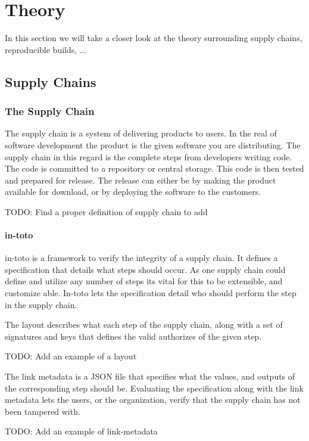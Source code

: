 \documentclass[../Main/thesis.tex]{subfiles}
\begin{document}
\chapter{Theory}
\label{ch:theory}
In this section we will take a closer look at the theory surrounding
supply chains, reproducible builds, ...

\section{Supply Chains}\label{sec:supply_chain}
    \subsection*{The Supply Chain}
    The supply chain is a system of delivering products to users. In the real of
    software development the product is the given software you are distributing.
    The supply chain in this regard is the complete steps from developers
    writing code. The code is committed to a repository or central storage. This
    code is then tested and prepared for release. The release can either be by
    making the product available for download, or by deploying the software to
    the customers.

    TODO: Find a proper definition of supply chain to add

    \subsubsection*{in-toto}
    in-toto is a framework to verify the integrity of a supply chain. It defines
    a specification that details what steps should occur. As one supply chain
    could define and utilize any number of steps its vital for this to be
    extensible, and customize able. In-toto lets the specification detail who
    should perform the step in the supply chain.
  
    The layout describes what each step of the supply chain, along with a set of
    signatures and keys that defines the valid authorizes of the given step.

    TODO: Add an example of a layout

    The link metadata is a JSON file that specifies what the values, and outputs
    of the corresponding step should be. Evaluating the specification along with
    the link metadata lets the users, or the organization, verify that the
    supply chain has not been tampered with. 

    TODO: Add an example of link-metadata
\end{document}
